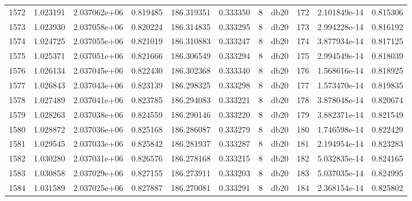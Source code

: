 \begin{tabular}{lrrrrrrlrrr}
1572 &    1.023191 &        2.037062e+06 &  0.819485 &              186.319351 &    0.333350 &       8 &         db20 &    172 &   2.101849e-14 &      0.815306 \\
1573 &    1.023930 &        2.037058e+06 &  0.820224 &              186.314835 &    0.333295 &       8 &         db20 &    173 &   2.994228e-14 &      0.816192 \\
1574 &    1.024725 &        2.037055e+06 &  0.821019 &              186.310883 &    0.333247 &       8 &         db20 &    174 &   3.877934e-14 &      0.817125 \\
1575 &    1.025371 &        2.037051e+06 &  0.821666 &              186.306549 &    0.333294 &       8 &         db20 &    175 &   2.994549e-14 &      0.818039 \\
1576 &    1.026134 &        2.037045e+06 &  0.822430 &              186.302368 &    0.333340 &       8 &         db20 &    176 &   1.568616e-14 &      0.818925 \\
1577 &    1.026843 &        2.037043e+06 &  0.823139 &              186.298325 &    0.333298 &       8 &         db20 &    177 &   1.573470e-14 &      0.819835 \\
1578 &    1.027489 &        2.037041e+06 &  0.823785 &              186.294083 &    0.333221 &       8 &         db20 &    178 &   3.878048e-14 &      0.820674 \\
1579 &    1.028263 &        2.037038e+06 &  0.824559 &              186.290146 &    0.333220 &       8 &         db20 &    179 &   3.882371e-14 &      0.821549 \\
1580 &    1.028872 &        2.037036e+06 &  0.825168 &              186.286087 &    0.333279 &       8 &         db20 &    180 &   1.746598e-14 &      0.822429 \\
1581 &    1.029545 &        2.037033e+06 &  0.825842 &              186.281937 &    0.333287 &       8 &         db20 &    181 &   2.194954e-14 &      0.823283 \\
1582 &    1.030280 &        2.037031e+06 &  0.826576 &              186.278168 &    0.333215 &       8 &         db20 &    182 &   5.032835e-14 &      0.824165 \\
1583 &    1.030858 &        2.037029e+06 &  0.827155 &              186.273911 &    0.333203 &       8 &         db20 &    183 &   5.037035e-14 &      0.824995 \\
1584 &    1.031589 &        2.037025e+06 &  0.827887 &              186.270081 &    0.333291 &       8 &         db20 &    184 &   2.368154e-14 &      0.825802 \\

\end{tabular}
